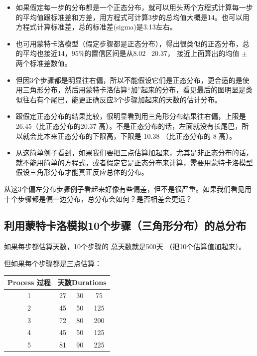 \begin{itemize}
\tightlist
\item
  如果假定每一步的分布都是一个正态分布，就可以用头两个方程式计算每一步的平均值跟标准差和方差，用方程式可计算3步的总均值大概是14。也可以用方程式计算标准差，总的标准差(sigma)是3.13左右。
  
\item
  也可用蒙特卡洛模型（假定步骤都是正态分布），得出很类似的正态分布，总的平均也接近14，95\%的置信区间是从8.02~ 20.37，
  接近上面算出的均值 \(\pm\) 两个标准差数值。
\item
  但因3个步骤都是明显往右偏，所以不能假设它们是正态分布，更合适的是使用三角形分布，然后用蒙特卡洛估算``加''起来的分布，看见最后的图明显是类似往右有个尾巴，能更正确反应3个步骤加起来的天数的估计分布。
\item
  跟假定正态分布的结果比较，很明显看到用三角形分布结果往右偏，上限是
  26.45（比正态分布的20.37
  高）。不是正态分布的话，左面就没有长尾巴，所以就会比本来正态分布的下限高，下限是
  10.38 （比正态分布的 8 高）。
\item
  从这简单例子看到，如果我们要把三点估算加起来，尤其是非正态分布的话，就不能用简单的方程式，或者假定它是正态分布来计算，需要用蒙特卡洛模型假设三角形分布才能真正反应总体的分布。\\
\end{itemize}

从这3个偏左分布步骤例子看起来好像有些偏差，但不是很严重。如果我们看见用十个步骤都是偏一边分布，总分布会如何？是否相差会更远？

\hypertarget{ux5229ux7528ux8499ux7279ux5361ux6d1bux6a21ux62df10ux4e2aux6b65ux9aa4ux4e09ux89d2ux5f62ux5206ux5e03ux7684ux603bux5206ux5e03}{%
\subsection{利用蒙特卡洛模拟10个步骤（三角形分布）的总分布}\label{ux5229ux7528ux8499ux7279ux5361ux6d1bux6a21ux62df10ux4e2aux6b65ux9aa4ux4e09ux89d2ux5f62ux5206ux5e03ux7684ux603bux5206ux5e03}}

如果每步都估算天数，10个步骤的 总天数就是500天 （把10个估算值加起来）。

但如果每个步骤都是三点估算：



\begin{tabular}{|c|c|c|c|}
\hline
Process 过程&\multicolumn{3}{c|}{天数Durations}\\
\hline
1&27&30&75\\
\hline
2&45&50&125\\
\hline
3&72&80&200\\
\hline
4&45&50&125\\
\hline
5&81&90&225\\
\hline
\end{tabular}

